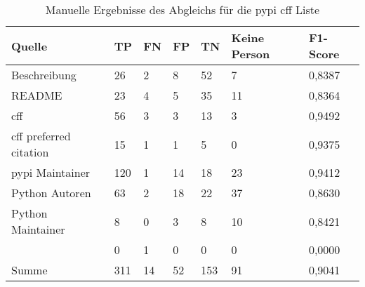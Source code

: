 \begin{table}[H]
    \centering
    \begin{tabularx}{\textwidth}{XR{.7cm}R{.7cm}R{.7cm}R{.7cm}R{2.8cm}R{2cm}}
        \toprule
        \textbf{Quelle} & \textbf{TP} & \textbf{FN} & \textbf{FP} & \textbf{TN} & \textbf{Keine Person} & \textbf{F1-Score} \\ \midrule
        Beschreibung                 & 26  & 2  & 8  & 52  & 7  & 0,8387 \\
        README                       & 23  & 4  & 5  & 35  & 11 & 0,8364 \\
        \gls{cff}                    & 56  & 3  & 3  & 13  & 3  & 0,9492 \\
        \gls{cff} preferred citation & 15  & 1  & 1  & 5   & 0  & 0,9375 \\
        \gls{pypi} Maintainer        & 120 & 1  & 14 & 18  & 23 & 0,9412 \\
        Python Autoren               & 63  & 2  & 18 & 22  & 37 & 0,8630 \\
        Python Maintainer            & 8   & 0  & 3  & 8   & 10 & 0,8421 \\
                      & 0   & 1  & 0  & 0   & 0  & 0,0000 \\ \midrule
        Summe                        & 311 & 14 & 52 & 153 & 91 & 0,9041 \\
        \bottomrule
    \end{tabularx}
    \caption{Manuelle Ergebnisse des Abgleichs für die \gls{pypi} \gls{cff} Liste}
    \label{tab:pypi_cff_matching_results_manual_anhang}
\end{table}

